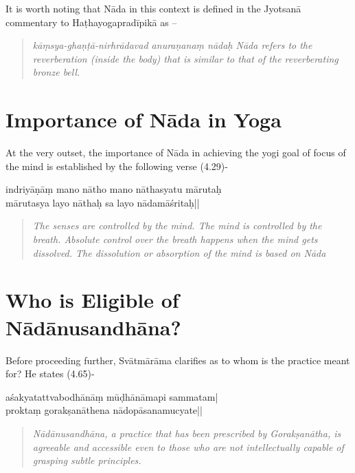 It is worth noting that Nāda in this context is defined in the Jyotsanā commentary to Haṭhayogapradīpikā as –

\begin{quote}
\begin{center}
\textit{kāṃsya-ghaṇṭā-nirhrādavad anuraṇanaṃ nādaḥ Nāda refers to the reverberation (inside the body) that is similar to that of the reverberating bronze bell.}
\end{center}
\end{quote}

\section*{Importance of Nāda in Yoga}

At the very outset, the importance of Nāda in achieving the yogi goal of focus of the mind is established by the following verse (4.29)-

\begin{shloka}
indriyāṇāṃ mano nātho mano nāthasyatu mārutaḥ\\
mārutasya layo nāthaḥ sa layo nādamāśritaḥ||
\end{shloka}

\begin{quote}
\textit{The senses are controlled by the mind. The mind is controlled by the breath. Absolute control over the breath happens when the mind gets dissolved. The dissolution or absorption of the mind is based on Nāda}
\end{quote}

\section*{Who is Eligible of Nādānusandhāna?}

Before proceeding further, Svātmārāma clarifies as to whom is the practice meant for? He states (4.65)-

\begin{shloka}
aśakyatattvabodhānāṃ mūḍhānāmapi sammatam|\\
proktaṃ gorakṣanāthena nādopāsanamucyate|| 
\end{shloka}

\begin{quote}
\textit{Nādānusandhāna, a practice that has been prescribed by Gorakṣanātha, is agreeable and accessible even to those who are not intellectually capable of grasping subtle principles.}
\end{quote}

